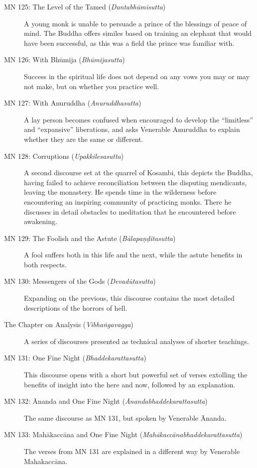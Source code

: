 \documentclass[12pt,openany]{book}%
\begin{document}
\begin{description}
\item[MN 125: The Level of the Tamed (\textit{\textsanskrit{Dantabhūmisutta}})] A young monk is unable to persuade a prince of the blessings of peace of mind. The Buddha offers similes based on training an elephant that would have been successful, as this was a field the prince was familiar with.%
\item[MN 126: With \textsanskrit{Bhūmija} (\textit{\textsanskrit{Bhūmijasutta}})] Success in the spiritual life does not depend on any vows you may or may not make, but on whether you practice well.%
\item[MN 127: With Anuruddha (\textit{\textsanskrit{Anuruddhasutta}})] A lay person becomes confused when encouraged to develop the “limitless” and “expansive” liberations, and asks Venerable Anuruddha to explain whether they are the same or different.%
\item[MN 128: Corruptions (\textit{\textsanskrit{Upakkilesasutta}})] A second discourse set at the quarrel of Kosambi, this depicts the Buddha, having failed to achieve reconciliation between the disputing mendicants, leaving the monastery. He spends time in the wilderness before encountering an inspiring community of practicing monks. There he discusses in detail obstacles to meditation that he encountered before awakening.%
\item[MN 129: The Foolish and the Astute (\textit{\textsanskrit{Bālapaṇḍitasutta}})] A fool suffers both in this life and the next, while the astute benefits in both respects.%
\item[MN 130: Messengers of the Gods (\textit{\textsanskrit{Devadūtasutta}})] Expanding on the previous, this discourse contains the most detailed descriptions of the horrors of hell.%
\item[The Chapter on Analysis (\textit{\textsanskrit{Vibhaṅgavagga}})] A series of discourses presented as technical analyses of shorter teachings.%
\item[MN 131: One Fine Night (\textit{\textsanskrit{Bhaddekarattasutta}})] This discourse opens with a short but powerful set of verses extolling the benefits of insight into the here and now, followed by an explanation.%
\item[MN 132: Ānanda and One Fine Night (\textit{\textsanskrit{Ānandabhaddekarattasutta}})] The same discourse as MN 131, but spoken by Venerable Ānanda.%
\item[MN 133: \textsanskrit{Mahākaccāna} and One Fine Night (\textit{\textsanskrit{Mahākaccānabhaddekarattasutta}})] The verses from MN 131 are explained in a different way by Venerable \textsanskrit{Mahakaccāna}.%

\end{description}
\end{document}
